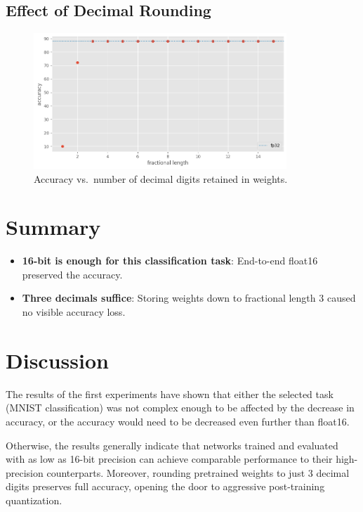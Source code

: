 \documentclass[11pt]{article}
\begin{document}
\subsection*{Effect of Decimal Rounding}
\begin{figure}[H]
	\centering
	\includegraphics[width=0.85\textwidth]{figures/118_accuracy.png}
	\caption{Accuracy vs.\ number of decimal digits retained in weights.}
\end{figure}

\section{Summary}
\begin{itemize}
	\item \textbf{16-bit is enough for this classification task}: End-to-end float16 preserved the accuracy.
	\item \textbf{Three decimals suffice}: Storing weights down to fractional length $3$ caused no visible accuracy loss.
\end{itemize}

\section{Discussion}

The results of the first experiments have shown that either the selected task
(MNIST classification) was not complex enough to be affected by the decrease in
accuracy, or the accuracy would need to be decreased even further than float16.

Otherwise, the results generally indicate that networks trained and evaluated
with as low as 16-bit precision can achieve comparable performance to their
high-precision counterparts. Moreover, rounding pretrained weights to just 3
decimal digits preserves full accuracy, opening the door to aggressive
post-training quantization.
\end{document}
